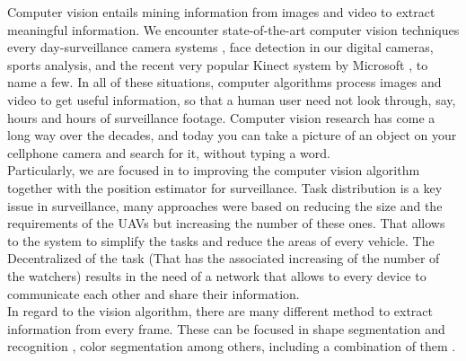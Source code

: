 Computer vision entails mining information from images and video to extract meaningful information. We encounter state-of-the-art computer vision techniques every day-surveillance camera systems \cite{traffic_surveillance_pergamon} \cite{distributed_surveillance} \cite{vehicle_detection}, face detection in our digital cameras, sports analysis, and the recent very popular Kinect system by Microsoft \cite{Kinect_intro}, to name a few. In all of these situations, computer algorithms process images and video to get useful information, so that a human user need not look through, say, hours and hours of surveillance footage. Computer vision research has come a long way over the decades, and today you can take a picture of an object on your cellphone camera and search for it, without typing a word. \\

Particularly, we are focused in to improving the computer vision algorithm together with the position estimator for surveillance. Task distribution \cite{Coop_Surv_aerial_JJ} \cite{Consensus_reaching_Xiao} \cite{Adaptative_tast_Meuth} \cite{distributed_architecture_Ivan_Maza}  is a key issue in surveillance, many approaches were based on reducing the size and the requirements of the UAVs but increasing the number of these ones. That allows to the system to simplify the tasks and reduce the areas of every vehicle. The Decentralized of the task \cite{descentralized_task_UAV} (That has the associated increasing of the number of the watchers) results in the need of a network that allows to every device to communicate each other and share their information. \\

In regard to the vision algorithm, there are many different method to extract information from every frame. These can be focused in shape segmentation and recognition \cite{shape_using_shape_context} \cite{Vehicle_recog_markov}, color segmentation \cite{} among others, including a combination of them \cite{realtime_signal_recon_shape_color} \cite{signal_recogn_shape_color} \cite{Robust_RT_tracking_color_face_Darrell}.


